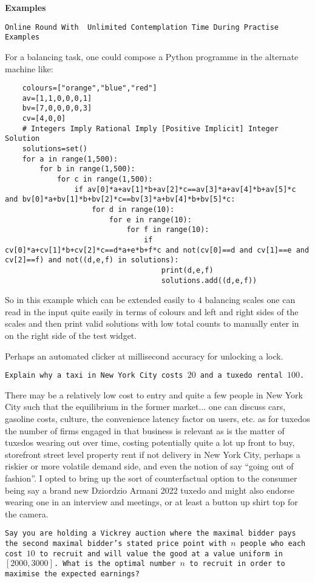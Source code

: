 \textbf{Examples}

\texttt{Online Round With ~Unlimited Contemplation Time During Practise Examples}

For a balancing task, one could compose a Python programme in the alternate machine like:

\begin{verbatim}
	colours=["orange","blue","red"]
	av=[1,1,0,0,0,1]
	bv=[7,0,0,0,0,3]
	cv=[4,0,0]
	# Integers Imply Rational Imply [Positive Implicit] Integer Solution
	solutions=set()
	for a in range(1,500):
		for b in range(1,500):
			for c in range(1,500):
				if av[0]*a+av[1]*b+av[2]*c==av[3]*a+av[4]*b+av[5]*c and bv[0]*a+bv[1]*b+bv[2]*c==bv[3]*a+bv[4]*b+bv[5]*c:
					for d in range(10):
						for e in range(10):
							for f in range(10):
								if cv[0]*a+cv[1]*b+cv[2]*c==d*a+e*b+f*c and not(cv[0]==d and cv[1]==e and cv[2]==f) and not((d,e,f) in solutions):
									print(d,e,f)
									solutions.add((d,e,f))
\end{verbatim}

So in this example which can be extended easily to $4$ balancing scales one can read in the input quite easily in terms of colours and left and right sides of the scales and then print valid solutions with low total counts to manually enter in on the right side of the test widget.

Perhaps an automated clicker at millisecond accuracy for unlocking a lock.

\texttt{Explain why a taxi in New York City costs $20$ and a tuxedo rental $100$.}

There may be a relatively low cost to entry and quite a few people in New York City such that the equilibrium in the former market... one can discuss cars, gasoline costs, culture, the convenience latency factor on users, etc. as for tuxedos the number of firms engaged in that business is relevant as is the matter of tuxedos wearing out over time, costing potentially quite a lot up front to buy, storefront street level property rent if not delivery in New York City, perhaps a riskier or more volatile demand side, and even the notion of say ``going out of fashion''. I opted to bring up the sort of counterfactual option to the consumer being say a brand new Dziordzio Armani 2022 tuxedo and might also endorse wearing one in an interview and meetings, or at least a button up shirt top for the camera.

\texttt{Say you are holding a Vickrey auction where the maximal bidder pays the second maximal bidder's stated price point with $n$ people who each cost $10$ to recruit and will value the good at a value uniform in $[2000, 3000]$. What is the optimal number $n$ to recruit in order to maximise the expected earnings?}

